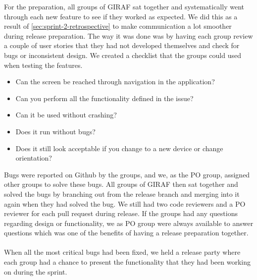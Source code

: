 For the preparation, all groups of GIRAF sat together and systematically went through each new feature to see if they worked as expected. We did this as a result of \autoref{sec:sprint-2-retrospective} to make communication a lot smoother during release preparation.
The way it was done was by having each group review a couple of user stories that they had not developed themselves and check for bugs or inconsistent design. 
We created a checklist that the groups could used when testing the features.
\begin{itemize}
    \item Can the screen be reached through navigation in the application?
    \item Can you perform all the functionality defined in the issue?
    \item Can it be used without crashing?
    \item Does it run without bugs?
    \item Does it still look acceptable if you change to a new device or change orientation?
\end{itemize}
Bugs were reported on Github by the groups, and we, as the PO group, assigned other groups to solve these bugs.
All groups of GIRAF then sat together and solved the bugs by branching out from the release branch and merging into it again when they had solved the bug. 
We still had two code reviewers and a PO reviewer for each pull request during release. 
If the groups had any questions regarding design or functionality, we as PO group were always available to answer questions which was one of the benefits of having a release preparation together.
\\\\
When all the most critical bugs had been fixed, we held a release party where each group had a chance to present the functionality that they had been working on during the sprint. 
